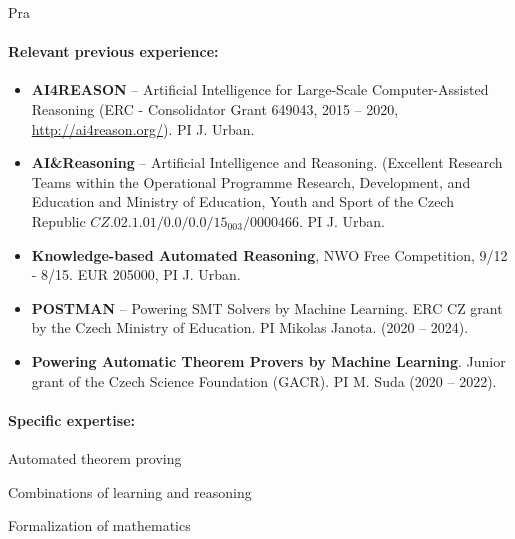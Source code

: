 \begin{sitedescription}{Pra}
\begin{compactitem}
\item %
\end{compactitem}


\paragraph{Relevant previous experience:}


\begin{itemize}
    \item \textbf{AI4REASON} -- Artificial Intelligence for Large-Scale Computer-Assisted Reasoning (ERC - Consolidator Grant 649043, 2015 -- 2020, \url{http://ai4reason.org/}). PI J. Urban.
    \item \textbf{AI\&Reasoning} -- Artificial Intelligence and Reasoning. (Excellent Research Teams within the Operational Programme Research, Development, and Education and Ministry of Education, Youth and Sport of the Czech Republic \begin{math}CZ.02.1.01/0.0/0.0/15_003/0000466\end{math}. PI J. Urban.
    \item \textbf{Knowledge-based Automated Reasoning}, NWO Free Competition, 9/12 - 8/15. EUR 205000, PI J. Urban.
    \item \textbf{POSTMAN} -- Powering SMT Solvers by Machine Learning. ERC CZ grant by the Czech Ministry of Education.  PI Mikolas Janota. (2020 -- 2024).
    \item \textbf{Powering Automatic Theorem Provers by Machine Learning}. Junior grant of the Czech Science Foundation (GACR). PI M. Suda (2020 -- 2022). 
    \end{itemize}


\paragraph{Specific expertise:}

\begin{compactitem}
\item Automated theorem proving
\item Combinations of learning and reasoning
\item Formalization of mathematics
\end{compactitem}


\end{sitedescription}

